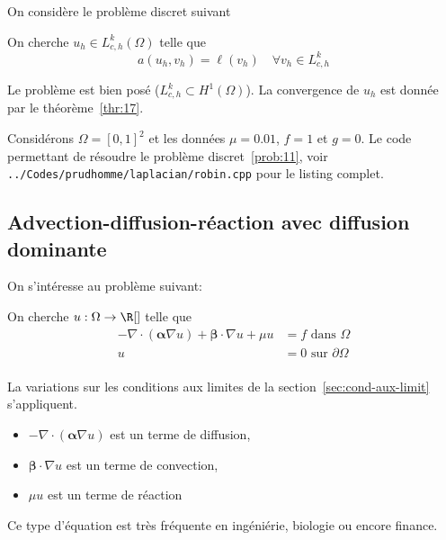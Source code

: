 On considère le problème discret suivant
\begin{problem}
  \label{prob:11}
  On cherche $u_h \in L^k_{c,h}(\Omega)$ telle que
  \begin{equation}
    \label{eq:87}
    a(u_h,v_h) = \ell(v_h)\quad \forall v_h \in L^k_{c,h}
  \end{equation}
\end{problem}
Le problème est bien posé  ($L^k_{c,h} \subset H^1(\Omega)$). La convergence de
$u_h$ est donnée par le théorème~\ref{thr:17}.

Considérons $\Omega=[0,1]^2$ et les données $\mu=0.01$, $f=1$ et $g=0$. Le
code \Feel permettant de résoudre le problème discret~\ref{prob:11}, voir
\texttt{../Codes/prudhomme/laplacian/robin.cpp} pour le listing complet.



\subsection{Advection-diffusion-réaction avec diffusion dominante}
\label{sec:advection-diffusion}

On s'intéresse au problème suivant:
\begin{problem}
  \label{prob:10}
  On cherche $u : \Omega \rightarrow \R[]$ telle que
  \begin{equation}
    \label{eq:30}
    \begin{split}
      -\nabla \cdot ( {\bm \alpha} \nabla u  ) + {\bm \beta} \cdot \nabla u + \mu u &= f
      \mbox{ dans } \Omega\\
      u &= 0 \mbox{ sur } \partial \Omega\\
    \end{split}
  \end{equation}
\end{problem}

La variations sur les conditions aux limites de la
section~\ref{sec:cond-aux-limit} s'appliquent.
\begin{itemize}
\item $-\nabla \cdot ( {\bm \alpha} \nabla u  )$ est un terme de diffusion,
\item ${\bm \beta} \cdot \nabla u$ est un terme de convection,
\item $\mu u$ est un terme de réaction
\end{itemize}
Ce type d'équation est très fréquente en ingéniérie, biologie ou encore finance.

